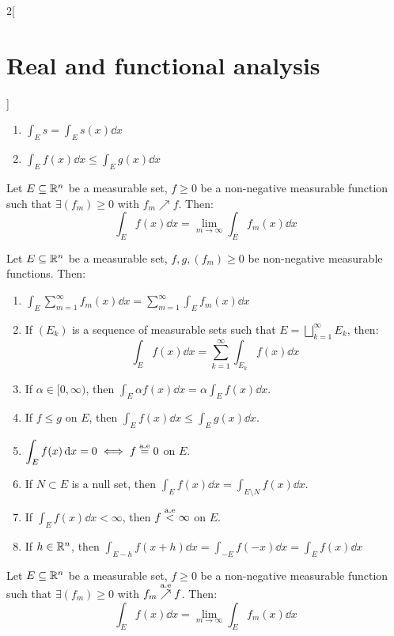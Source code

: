 \documentclass[../../../main_math.tex]{subfiles}
\begin{document}
\begin{multicols}{2}[\section{Real and functional analysis}]
\begin{proposition}
    \begin{enumerate}
      \item $\displaystyle\int_E s=\int_Es(x)\dd{x}$
      \item $\displaystyle\int_E f(x)\dd{x}\leq \int_Eg(x)\dd{x}$
    \end{enumerate}
  \end{proposition}
  \begin{theorem}
    Let $E\subseteq\mathbb{R}^n$ be a measurable set, $f\geq 0$ be a non-negative measurable function such that $\exists (f_m)\geq 0$ with $f_m\nearrow f$. Then: $$\int_Ef(x)\dd{x}=\lim_{m\to\infty}\int_Ef_m(x)\dd{x}$$
  \end{theorem}
  \begin{proposition}
    Let $E\subseteq\mathbb{R}^n$ be a measurable set, $f, g, (f_m)\geq 0$ be non-negative measurable functions. Then:
    \begin{enumerate}
      \item $\displaystyle\int_E\sum_{m=1}^\infty f_m(x)\dd{x}=\sum_{m=1}^\infty\int_E f_m(x)\dd{x}$
      \item If $(E_k)$ is a sequence of measurable sets such that $E=\bigsqcup_{k=1}^\infty E_k$, then: $$\int_Ef(x)\dd{x}=\sum_{k=1}^\infty\int_{E_k}f(x)\dd{x}$$
      \item If $\alpha\in[0,\infty)$, then $\displaystyle\int_E\alpha f(x)\dd{x}=\alpha\int_Ef(x)\dd{x}$.
      \item If $f\leq g$ on $E$, then $\displaystyle\int_Ef(x)\dd{x}\leq\int_Eg(x)\dd{x}$.
      \item $\displaystyle\int_Ef(x)\dd{x}=0\iff f\overset{\text{a.e}}{=}0$ on $E$.
      \item If $N\subset E$ is a null set, then $\displaystyle\int_Ef(x)\dd{x}=\int_{E\setminus N}f(x)\dd{x}$.
      \item If $\displaystyle\int_Ef(x)\dd{x}<\infty$, then $f\overset{\text{a.e}}{<}\infty$ on $E$.
      \item If $h\in\mathbb{R}^n$, then $\displaystyle\int_{E-h}f(x+h)\dd{x}=\int_{-E}f(-x)\dd{x}=\int_{E}f(x)\dd{x}$
    \end{enumerate}
  \end{proposition}
  \begin{corollary}
    Let $E\subseteq\mathbb{R}^n$ be a measurable set, $f\geq 0$ be a non-negative measurable function such that $\exists (f_m)\geq 0$ with $f_m\overset{\text{a.e}}{\nearrow} f$. Then: $$\int_Ef(x)\dd{x}=\lim_{m\to\infty}\int_Ef_m(x)\dd{x}$$
  \end{corollary}
  \begin{theorem}

\end{theorem}
\end{multicols}
\end{document}
